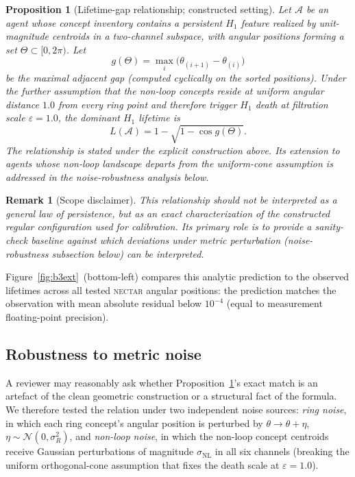 \documentclass[12pt]{article}
\newtheorem{proposition}{Proposition}
\newtheorem{remark}{Remark}
\begin{document}
\begin{proposition}[Lifetime-gap relationship; constructed setting]
\label{prop:lifetime-gap}
Let $\mathcal{A}$ be an agent whose concept inventory contains a
persistent $H_1$ feature realized by unit-magnitude centroids in a
two-channel subspace, with angular positions forming a set
$\Theta \subset [0, 2\pi)$. Let
\[
g(\Theta) = \max_{i} \bigl(\theta_{(i+1)} - \theta_{(i)}\bigr)
\]
be the maximal adjacent gap (computed cyclically on the sorted
positions). Under the further assumption that the non-loop concepts
reside at uniform angular distance $1.0$ from every ring point and
therefore trigger $H_1$ death at filtration scale $\varepsilon = 1.0$,
the dominant $H_1$ lifetime is
\[
L(\mathcal{A}) = 1 - \sqrt{1 - \cos g(\Theta)}.
\]
The relationship is stated under the explicit construction above.
Its extension to agents whose non-loop landscape departs from the
uniform-cone assumption is addressed in the noise-robustness
analysis below.
\end{proposition}

\begin{remark}[Scope disclaimer]
This relationship should not be interpreted as a general law of
persistence, but as an exact characterization of the constructed
regular configuration used for calibration. Its primary role is to
provide a sanity-check baseline against which deviations under metric
perturbation (noise-robustness subsection below) can be interpreted.
\end{remark}

Figure~\ref{fig:b3ext}~(bottom-left) compares this analytic
prediction to the observed lifetimes across all tested
\textsc{nectar} angular positions: the prediction matches the
observation with mean absolute residual below $10^{-4}$
(equal to measurement floating-point precision).

\subsection*{Robustness to metric noise}

A reviewer may reasonably ask whether
Proposition~\ref{prop:lifetime-gap}'s exact match is an artefact of
the clean geometric construction or a structural fact of the
formula. We therefore tested the relation under two independent
noise sources: \emph{ring noise}, in which each ring concept's
angular position is perturbed by $\theta \to \theta + \eta$,
$\eta \sim \mathcal{N}(0, \sigma_R^2)$, and \emph{non-loop noise},
in which the non-loop concept centroids receive Gaussian
perturbations of magnitude $\sigma_\mathrm{NL}$ in all six channels
(breaking the uniform orthogonal-cone assumption that fixes the
death scale at $\varepsilon = 1.0$).
\end{document}
